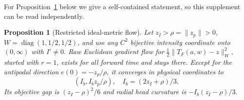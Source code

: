 \documentclass[10pt,a4paper]{article}
\newtheorem{proposition}[theorem]{Proposition}
\begin{document}
For Proposition~\ref{prop:dummyflow} below we give a self-contained statement, so this supplement can be read independently.
\begin{proposition}[Restricted ideal-metric flow]
\label{prop:dummyflow}
Let $z_I>\rho=\|z_p\|>0$, $W=\operatorname{diag}(1,1/2,1/2)$, and use any $C^2$ bijective intensity coordinate onto $(0,\infty)$ with $I'\ne0$. Raw Euclidean gradient flow for $\tfrac12\|T_F(a,w)-z\|_W^2$, started with $r=1$, exists for all forward time and stays there. Except for the antipodal direction $e(0)=-z_p/\rho$, it converges in physical coordinates to
\begin{equation}
 (I_b,I_b z_p/\rho),\quad I_b=(2z_I+\rho)/3.
\end{equation}
Its objective gap is $(z_I-\rho)^2/6$ and radial head curvature is $-I_b(z_I-\rho)/3$.
\end{proposition}
\end{document}
